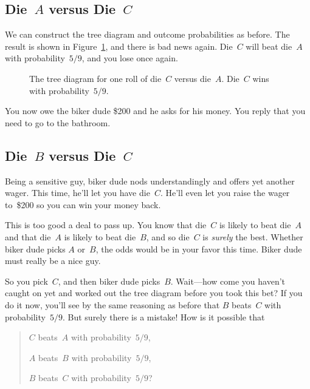 \subsection{Die~$A$ versus Die~$C$}

We can construct the tree diagram and outcome probabilities as
before.  The result is shown in Figure~\ref{fig:14A9}, and there is bad
news again.  Die~$C$ will beat die~$A$ with probability~$5/9$, and you
lose once again.

\begin{figure}


\caption{The tree diagram for one roll of die~$C$ versus die~$A$.
  Die~$C$ wins with probability~$5/9$.}

\label{fig:14A9}

\end{figure}

You now owe the biker dude \$200 and he asks for his money.  You reply
that you need to go to the bathroom.

\subsection{Die~$B$ versus Die~$C$}

Being a sensitive guy, biker dude nods understandingly and offers yet
another wager.  This time, he'll let you have die~$C$.  He'll even let
you raise the wager to~\$200 so you can win your money back.

This is too good a deal to pass up.  You know that die~$C$ is likely
to beat die~$A$ and that die~$A$ is likely to beat die~$B$, and so
die~$C$ is \emph{surely} the best.  Whether biker dude picks $A$
or~$B$, the odds would be in your favor this time.  Biker dude must
really be a nice guy.

So you pick~$C$, and then biker dude picks~$B$.  Wait---how come you
haven't caught on yet and worked out the tree diagram before you took
this bet?  If you do it now, you'll see by the same reasoning as
before that $B$ beats~$C$ with probability~$5/9$.  But surely there is
a mistake!  How is it possible that
\begin{quote}

$C$ beats~$A$ with probability~$5/9$,

$A$ beats~$B$ with probability~$5/9$,

$B$ beats~$C$ with probability~$5/9$?
\end{quote}


